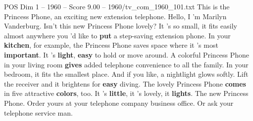 \begin{textsample}{POS Dim 1 – 1960 – Score 9.00 – 1960/tv\_com\_1960\_101.txt}  \label{ex:f1_pos_022}
This is the Princess Phone, an exciting new extension telephone.
Hello, I 'm Marilyn Vanderburg.
Isn't this new Princess Phone lovely?
It 's so small, it fits easily almost anywhere you 'd like to \textbf{put} a step-saving extension phone.
In your \textbf{kitchen}, for example, the Princess Phone saves space where it 's most \textbf{important}.
It 's \textbf{light}, \textbf{easy} to hold or move around.
A colorful Princess Phone in your living room \textbf{gives} added telephone convenience to all the family.
In your bedroom, it fits the smallest place.
And if you like, a nightlight glows softly.
Lift the receiver and it brightens for \textbf{easy} diving.
The lovely Princess Phone \textbf{comes} in five attractive \textbf{colors}, too.
It 's \textbf{little}, it 's lovely, it \textbf{lights}.
The new Princess Phone.
Order yours at your telephone company business office.
Or ask your telephone service man.

\end{textsample}
